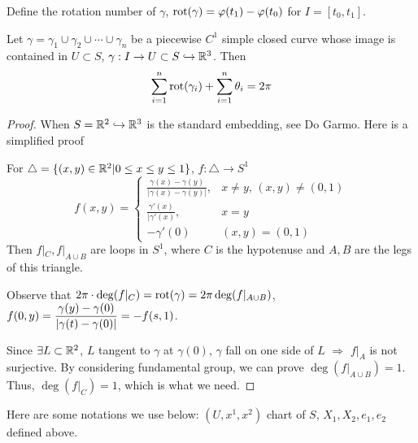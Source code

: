 Define the rotation number of  $ \gamma $,  $ \mathrm{rot}(\gamma)=\varphi(t_1)-\varphi(t_0) $ for  $ I=[t_0,t_1] $.

\begin{theorem}
    Let  $ \gamma=\gamma_1\cup\gamma_2\cup\cdots\cup\gamma_n $ be a piecewise  $ C^1 $ simple closed curve whose image is contained in  $ U\subset S $,  $ \gamma:I\rightarrow U\subset S\hookrightarrow\mathbb R^3 $. Then 
    \[\sum_{i=1}^n\mathrm{rot}(\gamma_i)+\sum_{i=1}^n\theta_i=2\pi\]    
\end{theorem}

\begin{proof}
    When  $ S=\mathbb R^2\hookrightarrow\mathbb R^3 $ is the standard embedding, see Do Garmo. Here is a simplified proof

    For  $ \triangle=\{(x,y)\in \mathbb R^2|0 \leq x \leq y  \leq 1\} $,  $ f:\triangle\rightarrow S^1 $ 
    \begin{equation}
        f(x,y)=\begin{cases}
            \frac{\gamma(x)-\gamma(y)}{|\gamma(x)-\gamma(y)|},&x\neq y,\,(x,y)\neq (0,1)\\
            \frac{\gamma'(x)}{|\gamma'(x)},&x=y\\
            -\gamma'(0)&(x,y)=(0,1)
        \end{cases}
    \end{equation}
    Then  $ f|_C,f|_{A\cup B} $ are loops in  $ S^1 $, where  $ C $ is the hypotenuse and  $ A,B $ are the legs of this triangle. 

    Observe that  $ 2\pi\cdot \deg(f|_C)=\mathrm{rot}(\gamma)=2\pi\deg(f|_{A\cup B}) $,  $ f(0,y)=\displaystyle\frac{\gamma(y)-\gamma(0)}{|\gamma(t)-\gamma(0)|}=-f(s,1) $.  

    Since  $ \exists L\subset \mathbb R^2 $,  $ L $ tangent to  $ \gamma $ at  $ \gamma(0) $,  $ \gamma $ fall on one side of  $ L $ $ \Rightarrow  $  $ f|_A $ is not surjective. By considering fundamental group, we can prove  $ \deg(f|_{A\cup B})=1 $. Thus,  $ \deg(f|_C)=1 $, which is what we need.        
\end{proof}

Here are some notations we use below:
 $ (U,x^1,x^2) $ chart of  $ S $,  $ X_1,X_2,e_1,e_2 $ defined above.
 
